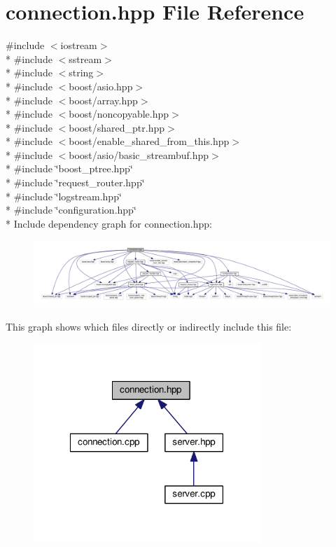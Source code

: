 \hypertarget{a00056}{\section{connection.\-hpp File Reference}
\label{a00056}
}
{\ttfamily \#include $<$iostream$>$}\\*
{\ttfamily \#include $<$sstream$>$}\\*
{\ttfamily \#include $<$string$>$}\\*
{\ttfamily \#include $<$boost/asio.\-hpp$>$}\\*
{\ttfamily \#include $<$boost/array.\-hpp$>$}\\*
{\ttfamily \#include $<$boost/noncopyable.\-hpp$>$}\\*
{\ttfamily \#include $<$boost/shared\-\_\-ptr.\-hpp$>$}\\*
{\ttfamily \#include $<$boost/enable\-\_\-shared\-\_\-from\-\_\-this.\-hpp$>$}\\*
{\ttfamily \#include $<$boost/asio/basic\-\_\-streambuf.\-hpp$>$}\\*
{\ttfamily \#include \char`\"{}boost\-\_\-ptree.\-hpp\char`\"{}}\\*
{\ttfamily \#include \char`\"{}request\-\_\-router.\-hpp\char`\"{}}\\*
{\ttfamily \#include \char`\"{}logstream.\-hpp\char`\"{}}\\*
{\ttfamily \#include \char`\"{}configuration.\-hpp\char`\"{}}\\*
Include dependency graph for connection.\-hpp\-:\nopagebreak
\begin{figure}[H]
\begin{center}
\leavevmode
\includegraphics[width=350pt]{a00102}
\end{center}
\end{figure}
This graph shows which files directly or indirectly include this file\-:\nopagebreak
\begin{figure}[H]
\begin{center}
\leavevmode
\includegraphics[width=243pt]{a00103}
\end{center}
\end{figure}
